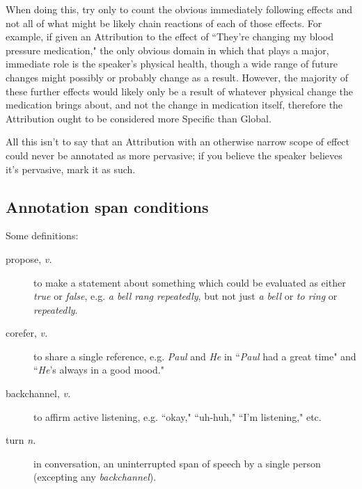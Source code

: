 \documentclass[a4paper,12pt]{article}
\begin{document}
\begin{enumerate}
\begin{description}
                    When doing this, try only to count the obvious immediately following effects and not all of what might be likely chain reactions of each of those effects. For example, if given an Attribution to the effect of ``They're changing my blood pressure medication," the only obvious domain in which that plays a major, immediate role is the speaker's physical health, though a wide range of future changes might possibly or probably change as a result. However, the majority of these further effects would likely only be a result of whatever physical change the medication brings about, and not the change in medication itself, therefore the Attribution ought to be considered more Specific than Global.

                    All this isn't to say that an Attribution with an otherwise narrow scope of effect could never be annotated as more pervasive; if you believe the speaker believes it's pervasive, mark it as such.
            \end{description}
        \end{enumerate}

    \newpage
    \subsection{Annotation span conditions} \label{conditions}
        Some definitions:
        \begin{description}
            \item[propose, \emph{v.}] to make a statement about something which could be evaluated as either \emph{true} or \emph{false},
                e.g. \emph{a bell rang repeatedly}, but not just \emph{a bell} or \emph{to ring} or \emph{repeatedly}.
            \item[corefer, \emph{v.}] to share a single reference,
                e.g. \emph{Paul} and \emph{He} in ``\emph{Paul} had a great time" and ``\emph{He}'s always in a good mood."
            \item[backchannel, \emph{v.}] to affirm active listening, e.g. ``okay," ``uh-huh," ``I'm listening," etc.
            \item[turn \emph{n.}] in conversation, an uninterrupted span of speech by a single person (excepting any \emph{backchannel}).
        \end{description}
\end{document}
